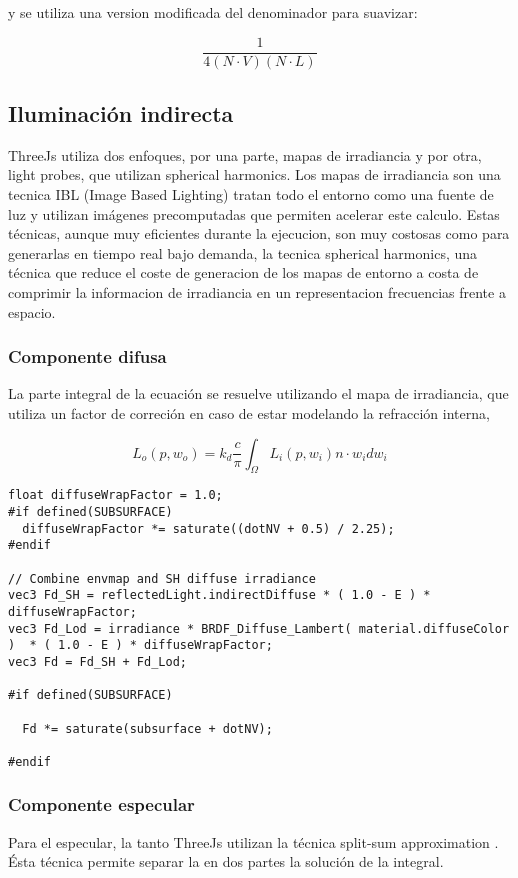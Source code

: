   y se utiliza una version modificada del denominador para suavizar:

  \begin{equation}
  \frac{1}{4(N\cdot{V})(N\cdot{L})}
  \end{equation}
  \singlespacing

  \subsection{Iluminaci\'on indirecta}
    ThreeJs utiliza dos enfoques, por una parte, mapas de irradiancia y por otra, light probes, que
    utilizan spherical harmonics. Los mapas de irradiancia son una tecnica IBL (Image Based Lighting)
    tratan todo el entorno como una fuente de luz y utilizan im\'agenes precomputadas que permiten
    acelerar este calculo. Estas t\'ecnicas, aunque muy eficientes durante la ejecucion, son muy
    costosas como para generarlas en tiempo real bajo demanda, la tecnica spherical harmonics, una
    t\'ecnica que reduce el coste de generacion de los mapas de entorno a costa de comprimir la
    informacion de irradiancia en un representacion frecuencias frente a espacio.

    \subsubsection{Componente difusa}
      La parte integral de la ecuaci\'on se resuelve utilizando el mapa de irradiancia,
      que utiliza un factor de correci\'on en caso de estar modelando la refracci\'on interna,

      $$
      L_o(p, w_o) = k_d \frac{c}{\pi} \int_{\Omega}{L_i(p, w_i) n\cdot{w_i}dw_i}{}
      $$

      \begin{lstlisting}
float diffuseWrapFactor = 1.0;
#if defined(SUBSURFACE)
  diffuseWrapFactor *= saturate((dotNV + 0.5) / 2.25);
#endif

// Combine envmap and SH diffuse irradiance
vec3 Fd_SH = reflectedLight.indirectDiffuse * ( 1.0 - E ) * diffuseWrapFactor;
vec3 Fd_Lod = irradiance * BRDF_Diffuse_Lambert( material.diffuseColor )  * ( 1.0 - E ) * diffuseWrapFactor;
vec3 Fd = Fd_SH + Fd_Lod;

#if defined(SUBSURFACE)

  Fd *= saturate(subsurface + dotNV);

#endif
      \end{lstlisting}
      \singlespacing

    \subsubsection{Componente especular}
    \bgroup
      Para el especular, la tanto ThreeJs utilizan la t\'ecnica split-sum approximation
      \autocite{unreal}. \'Esta t\'ecnica permite separar la en dos partes la soluci\'on de la
      integral.

